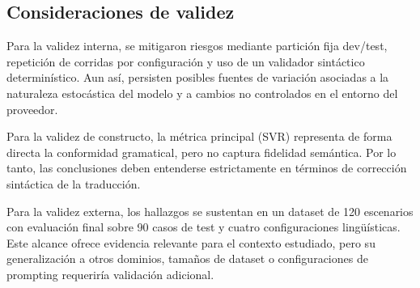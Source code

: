 \subsection{Consideraciones de validez}

Para la validez interna, se mitigaron riesgos mediante partición fija dev/test, repetición de corridas por configuración y uso de un validador sintáctico determinístico. Aun así, persisten posibles fuentes de variación asociadas a la naturaleza estocástica del modelo y a cambios no controlados en el entorno del proveedor.

Para la validez de constructo, la métrica principal (SVR) representa de forma directa la conformidad gramatical, pero no captura fidelidad semántica. Por lo tanto, las conclusiones deben entenderse estrictamente en términos de corrección sintáctica de la traducción.

Para la validez externa, los hallazgos se sustentan en un dataset de 120 escenarios con evaluación final sobre 90 casos de test y cuatro configuraciones lingüísticas. Este alcance ofrece evidencia relevante para el contexto estudiado, pero su generalización a otros dominios, tamaños de dataset o configuraciones de prompting requeriría validación adicional.
